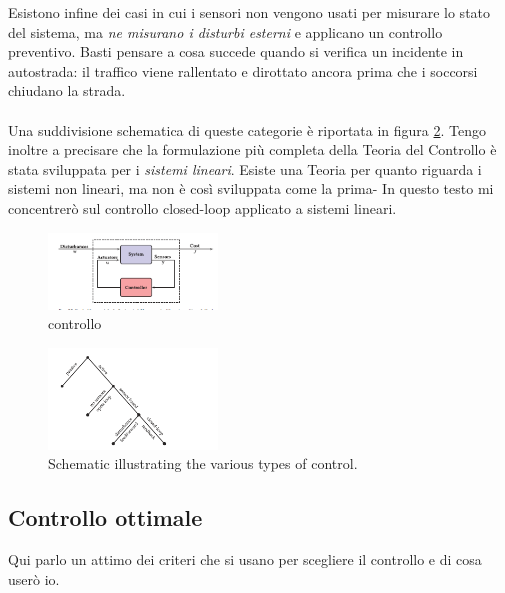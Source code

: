 Esistono infine dei casi in cui i sensori non vengono usati per misurare
lo stato del sistema, ma \emph{ne misurano i disturbi esterni} e applicano un
controllo preventivo. Basti pensare a cosa succede quando si verifica un incidente
in autostrada: il traffico viene rallentato e dirottato ancora prima che i soccorsi
chiudano la strada.

\paragraph{}
Una suddivisione schematica di queste categorie è riportata in figura \ref{fig:control-types}.
Tengo inoltre a precisare che la formulazione più completa della Teoria del Controllo
è stata sviluppata per i \emph{sistemi lineari}. Esiste una Teoria per quanto riguarda
i sistemi non lineari, ma non è così sviluppata come la prima-
In questo testo mi concentrerò sul controllo closed-loop applicato a sistemi lineari.

\begin{figure}[thb]
    \centering
    \includegraphics[width=0.4\textwidth]{assets/open-vs-closed.png}
    \caption{controllo }%
    \label{fig:open-vs-closed}
\end{figure}


\begin{figure}[thb]
    \centering
    \includegraphics[width=0.4\textwidth]{assets/control-types.png}
    \caption{Schematic illustrating the various types of control.} %
    \label{fig:control-types}
\end{figure}

\subsection{Controllo ottimale}
\label{subsec:controllo-ottimale}
Qui parlo un attimo dei criteri che si usano per scegliere il controllo e di
cosa userò io.

